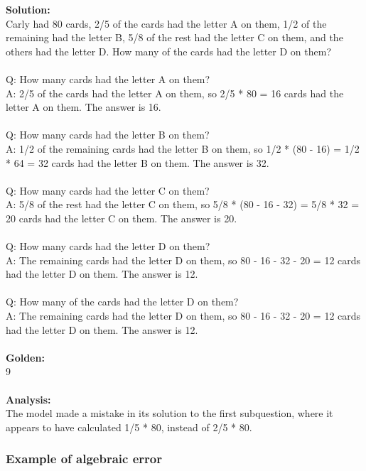 \textbf{Solution:} \\
Carly had 80 cards, 2/5 of the cards had the letter A on them, 1/2 of the remaining had the letter B, 5/8 of the rest had the letter C on them, and the others had the letter D. How many of the cards had the letter D on them? \\
 \\
Q: How many cards had the letter A on them? \\
A: 2/5 of the cards had the letter A on them, so 2/5 * 80 = 16 cards had the letter A on them. The answer is 16. \\
 \\
Q: How many cards had the letter B on them? \\
A: 1/2 of the remaining cards had the letter B on them, so 1/2 * (80 - 16) = 1/2 * 64 = 32 cards had the letter B on them. The answer is 32. \\
 \\
Q: How many cards had the letter C on them? \\
A: 5/8 of the rest had the letter C on them, so 5/8 * (80 - 16 - 32) = 5/8 * 32 = 20 cards had the letter C on them. The answer is 20. \\
 \\
Q: How many cards had the letter D on them? \\
A: The remaining cards had the letter D on them, so 80 - 16 - 32 - 20 = 12 cards had the letter D on them. The answer is 12. \\
 \\
Q: How many of the cards had the letter D on them? \\
A: The remaining cards had the letter D on them, so 80 - 16 - 32 - 20 = 12 cards had the letter D on them. The answer is 12. \\
 \\
\textbf{Golden:} \\
9 \\
 \\
\textbf{Analysis:} \\
The model made a mistake in its solution to the first subquestion, where it appears to have calculated 1/5 * 80, instead of 2/5 * 80.

\subsubsection{Example of algebraic error}

